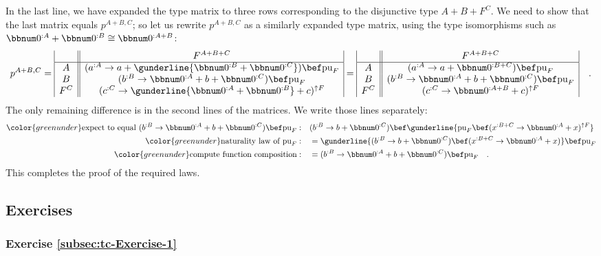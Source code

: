 In the last line, we have expanded the type matrix to three rows corresponding
to the disjunctive type $A+B+F^{C}$. We need to show that the last
matrix equals $p^{A+B,C}$; so let us rewrite $p^{A+B,C}$ as a similarly
expanded type matrix, using the type isomorphisms such as $\bbnum 0^{:A}+\bbnum 0^{:B}\cong\bbnum 0^{:A+B}$:
\[
p^{A+B,C}=\begin{array}{|c||c|}
 & F^{A+B+C}\\
\hline A & (a^{:A}\rightarrow a+\gunderline{\bbnum 0^{:B}+\bbnum 0^{:C}})\bef\text{pu}_{F}\\
B & (b^{:B}\rightarrow\bbnum 0^{:A}+b+\bbnum 0^{:C})\bef\text{pu}_{F}\\
F^{C} & (c^{:C}\rightarrow\gunderline{\bbnum 0^{:A}+\bbnum 0^{:B}}+c)^{\uparrow F}
\end{array}=\begin{array}{|c||c|}
 & F^{A+B+C}\\
\hline A & (a^{:A}\rightarrow a+\bbnum 0^{:B+C})\bef\text{pu}_{F}\\
B & (b^{:B}\rightarrow\bbnum 0^{:A}+b+\bbnum 0^{:C})\bef\text{pu}_{F}\\
F^{C} & (c^{:C}\rightarrow\bbnum 0^{:A+B}+c)^{\uparrow F}
\end{array}\quad.
\]
The only remaining difference is in the second lines of the matrices.
We write those lines separately: 
\begin{align*}
{\color{greenunder}\text{expect to equal }(b^{:B}\rightarrow\bbnum 0^{:A}+b+\bbnum 0^{:C})\bef\text{pu}_{F}:}\quad & (b^{:B}\rightarrow b+\bbnum 0^{:C})\bef\gunderline{\text{pu}_{F}\bef(x^{:B+C}\rightarrow\bbnum 0^{:A}+x)^{\uparrow F}}\\
{\color{greenunder}\text{naturality law of }\text{pu}_{F}:}\quad & =\gunderline{(b^{:B}\rightarrow b+\bbnum 0^{:C})\bef(x^{:B+C}\rightarrow\bbnum 0^{:A}+x)}\bef\text{pu}_{F}\\
{\color{greenunder}\text{compute function composition}:}\quad & =(b^{:B}\rightarrow\bbnum 0^{:A}+b+\bbnum 0^{:C})\bef\text{pu}_{F}\quad.
\end{align*}
This completes the proof of the required laws.

\subsection{Exercises}

\subsubsection{Exercise \label{subsec:tc-Exercise-1}\ref{subsec:tc-Exercise-1}}

